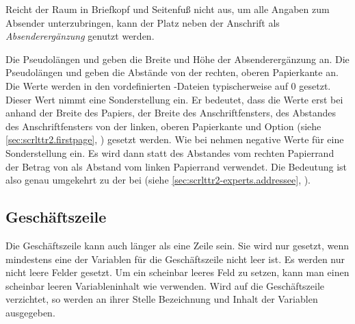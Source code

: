 \iffalse%
Insbesondere bei Geschäftsbriefen reicht der Platz im Briefkopf und im
Seitenfuß oftmals nicht aus, um alle Angaben des Absenders unterzubringen. Für
die zusätzlichen Informationen kann der Platz neben der Anschrift
genutzt werden. In dieser Anleitung wird dieses Feld \emph{Absenderergänzung}
genannt.%
\else%
Reicht der Raum in Briefkopf und Seitenfuß nicht aus, um alle Angaben zum
Absender unterzubringen, kann der Platz neben der Anschrift als
\emph{Absenderergänzung} genutzt werden.%
\fi


\begin{Declaration}
\end{Declaration}
Die Pseudolängen  und
 geben die Breite und
Höhe der Absenderergänzung an. Die Pseudolängen  und
 geben die Abstände von der rechten, oberen
Papierkante an. Die Werte werden in den vordefinierten -Dateien
typischerweise auf 0 gesetzt. Dieser Wert nimmt
eine Sonderstellung ein. Er bedeutet, dass die Werte erst bei
 anhand der Breite des
Papiers, der Breite des Anschriftfensters, des Abstandes des
Anschriftfensters von der linken, oberen Papierkante und
Option  (siehe
\autoref{sec:scrlttr2.firstpage}, )
gesetzt werden. Wie bei  nehmen
negative Werte für  eine Sonderstellung ein. Es wird dann
statt des Abstandes vom rechten Papierrand der Betrag von 
als Abstand vom linken Papierrand verwendet. Die Bedeutung ist also genau
umgekehrt zu der bei  (siehe
\autoref{sec:scrlttr2-experts.addressee},
).%
\EndIndexGroup
%
\EndIndexGroup


\subsection{Geschäftszeile}
%
\BeginIndexGroup
{}%

Die Geschäftszeile kann auch länger als eine Zeile sein. Sie wird nur gesetzt,
wenn mindestens eine der Variablen für die Geschäftszeile nicht leer ist.  Es
werden nur nicht leere Felder gesetzt. Um ein scheinbar leeres
Feld zu setzen, kann man einen scheinbar leeren Variableninhalt wie
\Parameter{} verwenden. Wird auf die Geschäftszeile verzichtet, so
werden an ihrer Stelle Bezeichnung und Inhalt der Variablen
 ausgegeben. %
\iffalse%
Informationen, wie Variablen zur Geschäftszeile hinzugefügt oder entfernt
werden, sind in \autoref{sec:scrlttr2-experts.variables},
\DescPageRef{scrlttr2-experts.cmd.removereffields} zu finden.%
\fi



